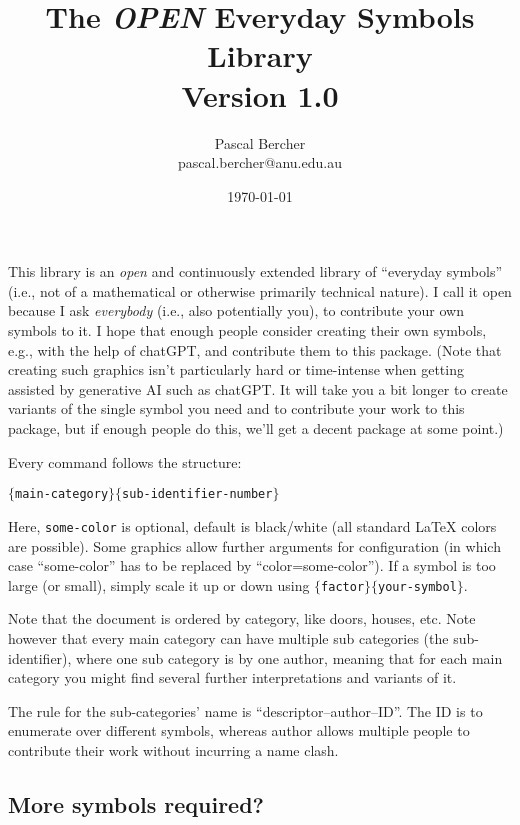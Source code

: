 \documentclass{article}
\begin{document}
\title{The \emph{OPEN} Everyday Symbols Library\\[1ex]\large Version 1.0}
\author{Pascal Bercher\\pascal.bercher@anu.edu.au}
\date{\today}

\maketitle

This library is an \emph{open} and continuously extended library of ``everyday symbols'' (i.e., not of a mathematical or otherwise primarily technical nature). I call it open because I ask \emph{everybody} (i.e., also potentially you), to contribute your own symbols to it. I hope that enough people consider creating their own symbols, e.g., with the help of chatGPT, and contribute them to this package. (Note that creating such graphics isn't particularly hard or time-intense when getting assisted by generative AI such as chatGPT. It will take you a bit longer to create variants of the single symbol you need and to contribute your work to this package, but if enough people do this, we'll get a decent package at some point.)

\medskip
Every command follows the structure:
\begin{center}
  \texttt{\string{}$\{$main-category$\}\{$sub-identifier-number$\}$}
\end{center}
Here, \texttt{some-color} is optional, default is black/white (all standard \LaTeX{} colors are possible). Some graphics allow further arguments for configuration (in which case ``some-color'' has to be replaced by ``color=some-color''). If a symbol is too large (or small), simply scale it up or down using
\texttt{\string\scalebox$\{$factor$\}\{$your-symbol$\}$}.

\medskip
Note that the document is ordered by category, like doors, houses, etc. Note however that every main category can have multiple sub categories (the sub-identifier), where one sub category is by one author, meaning that for each main category you might find several further interpretations and variants of it. 

\medskip
The rule for the sub-categories' name is ``descriptor--author--ID''. The ID is to enumerate over different symbols, whereas author allows multiple people to contribute their work without incurring a name clash.

\subsection*{More symbols required?}
\end{document}
